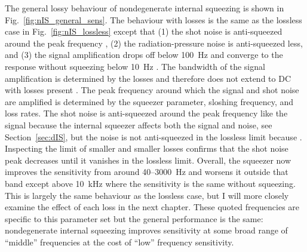 The general lossy behaviour of nondegenerate internal squeezing is shown in Fig.~\ref{fig:nIS_general_sens}. 
The behaviour with losses is the same as the lossless case in Fig.~\ref{fig:nIS_lossless} except that (1) the shot noise is anti-squeezed around the peak frequency , (2) the radiation-pressure noise is anti-squeezed less, and (3) the signal amplification drops off below 100~Hz and converge to the response without squeezing below 10~Hz . The bandwidth of the signal amplification is determined by the losses and therefore does not extend to DC with losses present . The peak frequency around which the signal and shot noise are amplified is determined by the squeezer parameter, sloshing frequency, and loss rates.
The shot noise is anti-squeezed around the peak frequency like the signal because the internal squeezer affects both the signal and noise, see Section~\ref{sec:dIS}, but the noise is not anti-squeezed in the lossless limit because . Inspecting the limit of smaller and smaller losses confirms that the shot noise peak decreases until it vanishes in the lossless limit.
Overall, the squeezer now improves the sensitivity from around 40--3000~Hz and worsens it outside that band except above 10~kHz where the sensitivity is the same without squeezing. This is largely the same behaviour as the lossless case, but I will more closely examine the effect of each loss in the next chapter.
These quoted frequencies are specific to this parameter set but the general performance is the same: nondegenerate internal squeezing improves sensitivity at some broad range of ``middle'' frequencies at the cost of ``low'' frequency sensitivity. 

